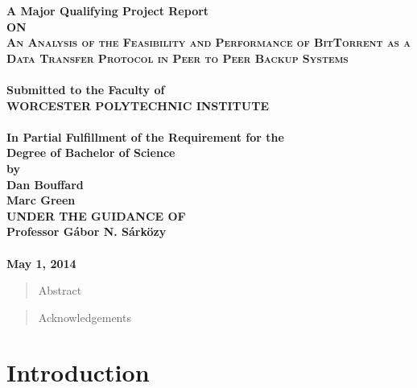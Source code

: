 \documentclass[12pt]{report}
\begin{document}
\begin{titlepage}
\begin{center}
\thispagestyle{empty}
\Large{\textbf{A Major Qualifying Project Report\\ \large{ON}}}\\[0.7cm]
\LARGE{\textsc {\textbf{An Analysis of the Feasibility and Performance of BitTorrent as a Data Transfer Protocol in Peer to Peer Backup Systems}}}\\[0.5cm]
\vspace{0.2cm}
\Large{\textbf{\\Submitted to the Faculty of }}
\LARGE{\textbf{\\WORCESTER POLYTECHNIC INSTITUTE\\}}
\vspace{0.5cm}
\Large{\textbf{\\In Partial Fulfillment of the Requirement for the}}
\Large{\textbf{\\Degree of Bachelor of Science}}
\vspace{0.5cm}
\Large{\textbf{\\by}}\\[0.5cm]
\large{\textbf{Dan Bouffard}}\\
\large{\textbf{Marc Green}}\\
\vspace{0.5cm}
\large{\textbf{UNDER THE GUIDANCE OF}}\\
\large{\textbf{Professor G\'abor N. S\'ark\"ozy}}\\
\vspace{1cm}
\large{\textbf{\\May 1, 2014}}\\
\end{center}
\end{titlepage}

\begin{abstract}
Abstract
\end{abstract}

\renewcommand{\abstractname}{Acknowledgements}
\begin{abstract}
Acknowledgements
\end{abstract}

\tableofcontents
\listoffigures

\chapter{Introduction}
\end{document}
